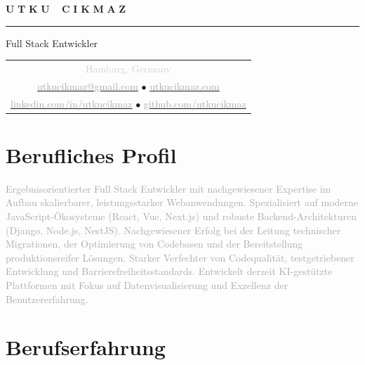 \documentclass[10pt,a4paper]{article}
\newcommand{\gradientname}[1]{%
  \textcolor{darkgray!90}{\Huge\bfseries U}%
  \textcolor{darkgray!80}{\Huge\bfseries T}%
  \textcolor{darkgray!70}{\Huge\bfseries K}%
  \textcolor{darkgray!60}{\Huge\bfseries U}%
  \textcolor{mediumgray!90}{\Huge\bfseries\ }%
  \textcolor{mediumgray!80}{\Huge\bfseries C}%
  \textcolor{mediumgray!70}{\Huge\bfseries I}%
  \textcolor{mediumgray!60}{\Huge\bfseries K}%
  \textcolor{mediumgray!50}{\Huge\bfseries M}%
  \textcolor{lightgray!80}{\Huge\bfseries A}%
  \textcolor{lightgray!70}{\Huge\bfseries Z}%
}
\begin{document}
\color{black}
\pagestyle{empty}

\begin{center}
  \vspace{-3pt}
  \gradientname{UTKU CIKMAZ}
  
  \vspace{4pt}
  \textcolor{verylightgray}{\rule{0.35\textwidth}{0.6pt}}
  
  \vspace{4pt}
  {\large\color{mediumgray}Full Stack Entwickler}
  
  \vspace{5pt}
  \begin{tabular}{c}
    \textcolor{lightgray}{\small Hamburg, Germany} \\[2pt]
    \href{mailto:utkucikmaz@gmail.com}{\textcolor{darkgray}{utkucikmaz@gmail.com}} \quad
    \textcolor{verylightgray}{$\bullet$} \quad
    \href{https://www.utkucikmaz.com}{\textcolor{darkgray}{utkucikmaz.com}} \\[1pt]
    \href{https://linkedin.com/in/utkucikmaz}{\textcolor{darkgray}{linkedin.com/in/utkucikmaz}} \quad
    \textcolor{verylightgray}{$\bullet$} \quad
    \href{https://github.com/utkucikmaz}{\textcolor{darkgray}{github.com/utkucikmaz}}
  \end{tabular}
\end{center}

\vspace{1pt}

\section*{Berufliches Profil}
\vspace{0pt}
\textcolor{darkgray}{%
Ergebnisorientierter Full Stack Entwickler mit nachgewiesener Expertise im Aufbau skalierbarer, leistungsstarker Webanwendungen. Spezialisiert auf moderne JavaScript-Ökosysteme (React, Vue, Next.js) und robuste Backend-Architekturen (Django, Node.js, NestJS). Nachgewiesener Erfolg bei der Leitung technischer Migrationen, der Optimierung von Codebasen und der Bereitstellung produktionsreifer Lösungen. Starker Verfechter von Codequalität, testgetriebener Entwicklung und Barrierefreiheitsstandards. Entwickelt derzeit KI-gestützte Plattformen mit Fokus auf Datenvisualisierung und Exzellenz der Benutzererfahrung.
}
\vspace{1pt}

\section*{Berufserfahrung}
\end{document}
